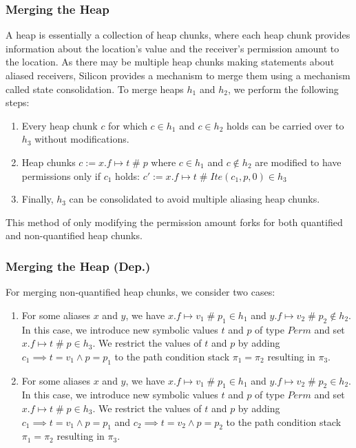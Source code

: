 \documentclass[11pt]{article}
\DeclareMathOperator{\perm}{\mathbin{\#}}
\begin{document}
    \subsubsection{Merging the Heap}

    A heap is essentially a collection of heap chunks, where each heap chunk provides information
    about the location's value and the receiver's permission amount to the location.
    As there may be multiple heap chunks making statements about aliased receivers,
    Silicon provides a mechanism to merge them using a mechanism called state consolidation.
    To merge heaps $h_1$ and $h_2$, we perform the following steps:

    \begin{enumerate}
        \item Every heap chunk $c$ for which $c \in h_1$ and $c \in h_2$ holds can be carried over to $h_3$
            without modifications.
        \item Heap chunks $c := x.f \mapsto t \perm p$ where $c \in h_1$ and $c \notin h_2$ are modified to
            have permissions only if $c_1$ holds: $c' := x.f \mapsto t \perm Ite(c_1, p, 0) \in h_3$
        \item Finally, $h_3$ can be consolidated to avoid multiple aliasing heap chunks.
    \end{enumerate}

    This method of only modifying the permission amount forks for both quantified and non-quantified heap chunks.

    \subsubsection{Merging the Heap (Dep.)}

    For merging non-quantified heap chunks, we consider two cases:

    \begin{enumerate}
        \item For some aliases $x$ and $y$, we have $x.f \mapsto v_1 \perm p_1 \in h_1$ and $y.f \mapsto v_2 \perm p_2 \notin h_2$.
            In this case, we introduce new symbolic values $t$ and $p$ of type $Perm$ and set $x.f \mapsto t \perm p \in h_3$.
            We restrict the values of $t$ and $p$ by adding $c_1 \implies t = v_1 \land p = p_1$
            to the path condition stack $\pi_1 = \pi_2$ resulting in $\pi_3$.
        \item For some aliases $x$ and $y$, we have $x.f \mapsto v_1 \perm p_1 \in h_1$ and $y.f \mapsto v_2 \perm p_2 \in h_2$.
            In this case, we introduce new symbolic values $t$ and $p$ of type $Perm$ and set $x.f \mapsto t \perm p \in h_3$.
            We restrict the values of $t$ and $p$ by adding $c_1 \implies t = v_1 \land p = p_1$ and $c_2 \implies t = v_2 \land p = p_2$
            to the path condition stack $\pi_1 = \pi_2$ resulting in $\pi_3$.
    \end{enumerate}
\end{document}
